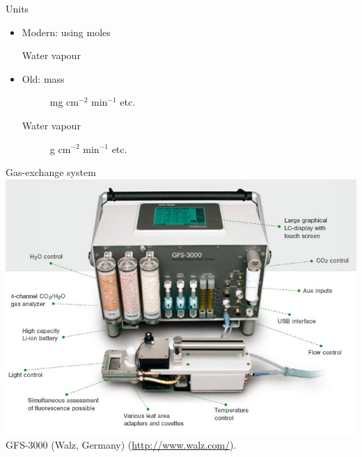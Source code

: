 \documentclass[10pt]{beamer}\usepackage[]{graphicx}\usepackage[]{color}
\begin{document}
\begin{frame}{Units}
    \begin{itemize}
        \item Modern: using moles
            \begin{description}
                \item[\COtwo] \umol
                \item[Water vapour] \mmol
            \end{description}
        \item Old: mass
            \begin{description}
                \item[\COtwo] mg cm$^{-2}$ min$^{-1}$ etc.
                \item[Water vapour] g cm$^{-2}$ min$^{-1}$ etc.
            \end{description}
    \end{itemize}
\end{frame}

\begin{frame}{Gas-exchange system}
    \centering
    \includegraphics[height=0.7\textheight]{photos/WalzGFS-3000}\\
    {\small GFS-3000 (Walz, Germany) (\url{http://www.walz.com/}).}
\end{frame}
\end{document}
